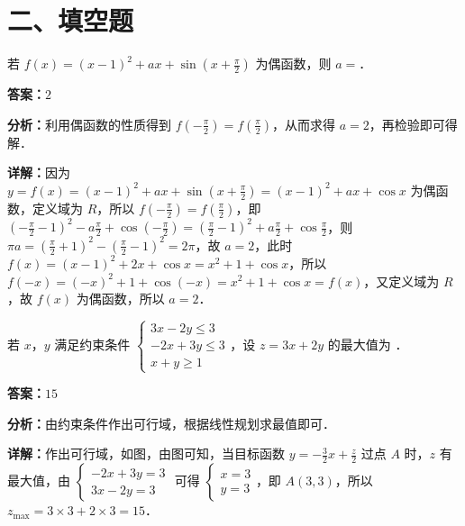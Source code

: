 \section*{二、填空题}

\begin{question}[points=5]
若 $f(x) = (x-1)^2 + ax + \sin\left(x + \frac{\pi}{2}\right)$ 为偶函数，则 $a = $．
\fillin[{$2$}]
\begin{solution}
\textbf{答案：}$2$

\textbf{分析：}利用偶函数的性质得到 $f\left(-\frac{\pi}{2}\right) = f\left(\frac{\pi}{2}\right)$，从而求得 $a=2$，再检验即可得解．

\textbf{详解：}因为 $y = f(x) = (x-1)^2 + ax + \sin\left(x+\frac{\pi}{2}\right) = (x-1)^2 + ax + \cos x$ 为偶函数，定义域为 $R$，所以 $f\left(-\frac{\pi}{2}\right) = f\left(\frac{\pi}{2}\right)$，即 $\left(-\frac{\pi}{2}-1\right)^2 - a\frac{\pi}{2} + \cos\left(-\frac{\pi}{2}\right) = \left(\frac{\pi}{2}-1\right)^2 + a\frac{\pi}{2} + \cos\frac{\pi}{2}$，则 $\pi a = \left(\frac{\pi}{2}+1\right)^2 - \left(\frac{\pi}{2}-1\right)^2 = 2\pi$，故 $a=2$，此时 $f(x) = (x-1)^2 + 2x + \cos x = x^2 + 1 + \cos x$，所以 $f(-x) = (-x)^2 + 1 + \cos(-x) = x^2+1+\cos x = f(x)$，又定义域为 $R$，故 $f(x)$ 为偶函数，所以 $a=2$．
\end{solution}
\end{question}

\begin{question}[points=5]
若 $x$，$y$ 满足约束条件 $\begin{cases} 3x - 2y \le 3 \\ -2x + 3y \le 3 \\ x + y \ge 1 \end{cases}$，设 $z = 3x + 2y$ 的最大值为 ．
\fillin[{$15$}]
\begin{solution}
\textbf{答案：}$15$

\textbf{分析：}由约束条件作出可行域，根据线性规划求最值即可．

\textbf{详解：}作出可行域，如图，由图可知，当目标函数 $y = -\frac{3}{2}x + \frac{z}{2}$ 过点 $A$ 时，$z$ 有最大值，由 $\begin{cases} -2x+3y=3 \\ 3x-2y=3 \end{cases}$ 可得 $\begin{cases} x=3 \\ y=3 \end{cases}$，即 $A(3,3)$，所以 $z_{\max} = 3\times3+2\times3=15$．
\end{solution}
\end{question}

